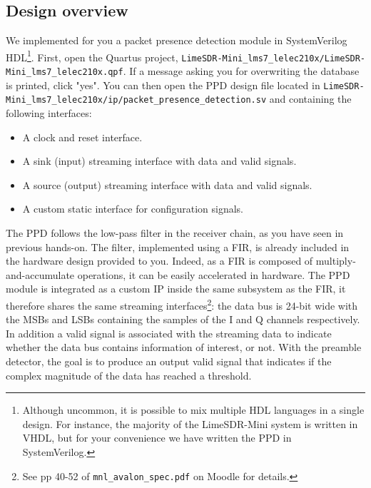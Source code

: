 \subsection{Design overview}
We implemented for you a packet presence detection module in SystemVerilog HDL\footnote{Although uncommon, it is possible to mix multiple HDL languages in a single design. For instance, the majority of the LimeSDR-Mini system is written in VHDL, but for your convenience we have written the PPD in SystemVerilog.}. First, open the Quartus project, \texttt{LimeSDR-Mini\_lms7\_lelec210x/LimeSDR-Mini\_lms7\_lelec210x.qpf}. If a message asking you for overwriting the database is printed, click "yes". You can then open the PPD design file located in \texttt{LimeSDR-Mini\_lms7\_lelec210x/ip/packet\_presence\_detection.sv} and containing the following interfaces:
\begin{itemize}
    \item A clock and reset interface.
    \item A sink (input) streaming interface with data and valid signals.
    \item A source (output) streaming interface with data and valid signals.
    \item A custom static interface for configuration signals.
\end{itemize}
The PPD follows the low-pass filter in the receiver chain, as you have seen in previous hands-on. The filter, implemented using a FIR, is already included in the hardware design provided to you. Indeed, as a FIR is composed of multiply-and-accumulate operations, it can be easily accelerated in hardware. The  PPD module is integrated as a custom IP inside the same subsystem as the FIR, it therefore shares the same streaming interfaces\footnote{See pp 40-52 of \texttt{mnl\_avalon\_spec.pdf} on Moodle for details.}: the data bus is 24-bit wide with the MSBs and LSBs containing the samples of the I and Q channels respectively. In addition a valid signal is associated with the streaming data to indicate whether the data bus contains information of interest, or not. With the preamble detector, the goal is to produce an output valid signal that indicates if the complex magnitude of the data has reached a threshold.

